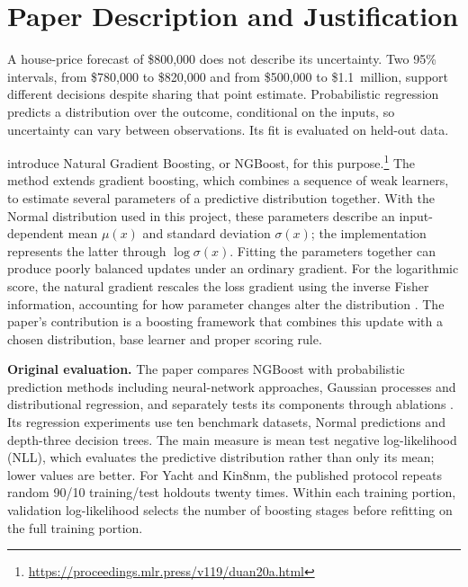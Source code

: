 \section{Paper Description and Justification}
\label{sec:paper}

A house-price forecast of \$800{,}000 does not describe its uncertainty.
Two 95\% intervals, from \$780{,}000 to \$820{,}000 and from \$500{,}000 to \$1.1~million, support different decisions despite sharing that point estimate.
Probabilistic regression predicts a distribution over the outcome, conditional on the inputs, so uncertainty can vary between observations.
Its fit is evaluated on held-out data.

\citet{duan2020ngboost} introduce Natural Gradient Boosting, or NGBoost, for this purpose.\footnote{\url{https://proceedings.mlr.press/v119/duan20a.html}}
The method extends gradient boosting, which combines a sequence of weak learners, to estimate several parameters of a predictive distribution together.
With the Normal distribution used in this project, these parameters describe an input-dependent mean $\mu(x)$ and standard deviation $\sigma(x)$; the implementation represents the latter through $\log\sigma(x)$.
Fitting the parameters together can produce poorly balanced updates under an ordinary gradient.
For the logarithmic score, the natural gradient rescales the loss gradient using the inverse Fisher information, accounting for how parameter changes alter the distribution \cite{amari1998natural}.
The paper's contribution is a boosting framework that combines this update with a chosen distribution, base learner and proper scoring rule.

\textbf{Original evaluation.}
The paper compares NGBoost with probabilistic prediction methods including neural-network approaches, Gaussian processes and distributional regression, and separately tests its components through ablations \cite{duan2020ngboost}.
Its regression experiments use ten benchmark datasets, Normal predictions and depth-three decision trees.
The main measure is mean test negative log-likelihood (NLL), which evaluates the predictive distribution rather than only its mean; lower values are better.
For Yacht and Kin8nm, the published protocol repeats random 90/10 training/test holdouts twenty times.
Within each training portion, validation log-likelihood selects the number of boosting stages before refitting on the full training portion.

